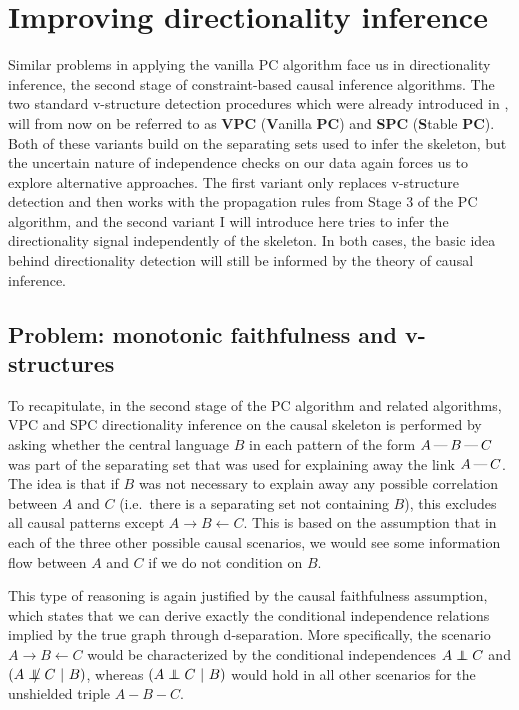 \section{Improving directionality inference}\label{sec:6.5}
Similar problems in applying the vanilla PC algorithm face us in directionality inference, the second stage of constraint-based causal inference algorithms. The two standard v-structure detection procedures which were already introduced in , will from now on be referred to as \textbf{VPC} (\textbf{V}anilla \textbf{PC}) and \textbf{SPC} (\textbf{S}table \textbf{PC}). Both of these variants build on the separating sets used to infer the skeleton, but the uncertain nature of independence checks on our data again forces us to explore alternative approaches. The first variant only replaces v-structure detection and then works with the propagation rules from Stage 3 of the PC algorithm, and the second variant I will introduce here tries to infer the directionality signal independently of the skeleton. In both cases, the basic idea behind directionality detection will still be informed by the theory of causal inference.

\subsection{Problem: monotonic faithfulness and v-structures}
To recapitulate, in the second stage of the PC algorithm and related algorithms, VPC and SPC directionality inference on the causal skeleton is performed by asking whether the central language $B$ in each pattern of the form $A \kern 2pt\hbox{---}\kern 2pt B \kern 2pt\hbox{---}\kern 2pt C$ was part of the separating set that was used for explaining away the link $A \kern 2pt\hbox{---}\kern 2pt C$. The idea is that if $B$ was not necessary to explain away any possible correlation between $A$ and $C$ (i.e.\ there is a separating set not containing $B$), this excludes all causal patterns except $A \rightarrow B \leftarrow C$. This is based on the assumption that in each of the three other possible causal scenarios, we would see some information flow between $A$ and $C$ if we do not condition on $B$.

This type of reasoning is again justified by the causal faithfulness assumption, which states that we can derive exactly the conditional independence relations implied by the true graph through d-separation. More specifically, the scenario $A \rightarrow B \leftarrow C$ would be characterized by the conditional independences $A \indep C$ and $(A \notindep C\ |\ B)$, whereas $(A \indep C\ |\ B)$ would hold in all other scenarios for the unshielded triple $A - B - C$.

